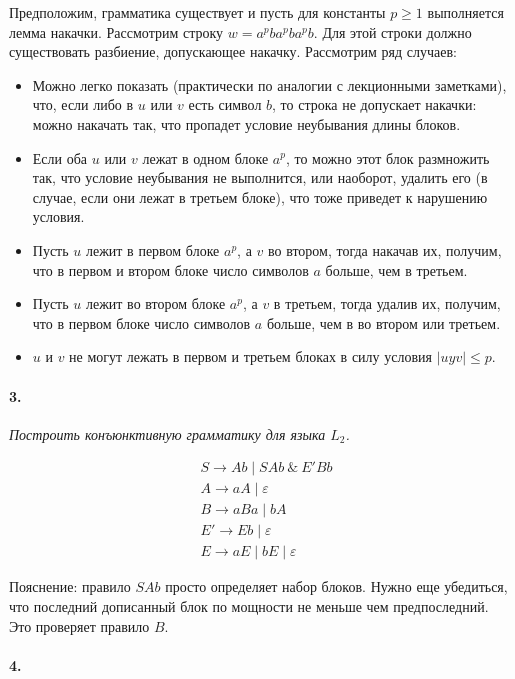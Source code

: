 \documentclass[russian]{article}
\begin{document}
Предположим, грамматика существует и пусть для константы $p \geqslant 1$ выполняется лемма накачки. Рассмотрим строку $w = a^pba^pba^pb$. Для этой строки должно существовать разбиение, допускающее накачку. Рассмотрим ряд случаев:

\begin{itemize}
\item Можно легко показать (практически по аналогии с лекционными заметками), что, если либо в $u$ или $v$ есть символ $b$, то строка не допускает накачки: можно накачать так, что пропадет условие неубывания длины блоков.
\item Если оба $u$ или $v$ лежат в одном блоке $a^p$, то можно этот блок размножить так, что условие неубывания не выполнится, или наоборот, удалить его (в случае, если они лежат в третьем блоке), что тоже приведет к нарушению условия.
\item Пусть $u$ лежит в первом блоке $a^p$, а $v$ во втором, тогда накачав их, получим, что в первом и втором блоке число символов $a$ больше, чем в третьем.
\item Пусть $u$ лежит во втором блоке $a^p$, а $v$ в третьем, тогда удалив их, получим, что в первом блоке число символов $a$ больше, чем в во втором или третьем.
\item $u$ и $v$ не могут лежать в первом и третьем блоках в силу условия $|uyv| \leqslant p$.
\end{itemize}

\paragraph*{3.}

\textit{Построить конъюнктивную грамматику для языка $L_2$.}

\begin{align*}
& S \to Ab \mid SAb\ \&\ E'Bb \\
& A \to aA \mid \varepsilon \\
& B \to aBa \mid bA \\
& E' \to Eb \mid \varepsilon \\
& E \to aE \mid bE \mid \varepsilon
\end{align*}

Пояснение: правило $SAb$ просто определяет набор блоков. Нужно еще убедиться, что последний дописанный блок по мощности не меньше чем предпоследний. Это проверяет правило $B$.

\paragraph*{4.}
\end{document}
